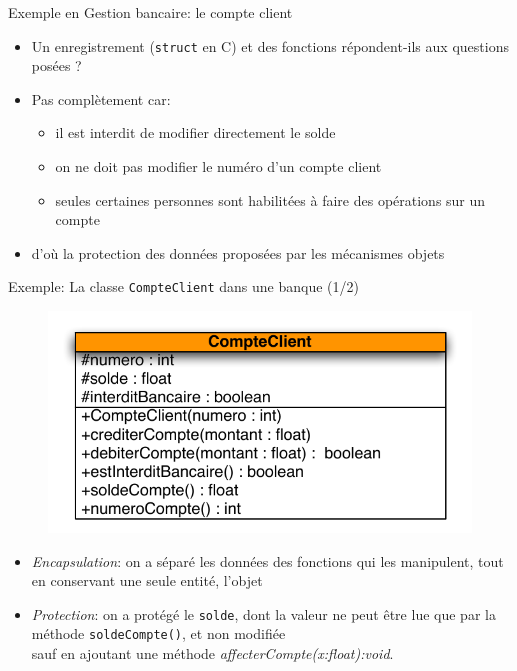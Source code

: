\begin{frame}{Exemple en Gestion bancaire: le compte client}
\begin{itemize}
	\item Un enregistrement (\texttt{struct} en C) et des fonctions répondent-ils aux questions posées ?
	\item Pas complètement car:

\begin{itemize}
	\item il est interdit de modifier directement le solde
	\item on ne doit pas modifier le numéro d'un compte client
	\item seules certaines personnes sont habilitées à faire des opérations sur un compte
\end{itemize}

\item d'où la protection des données proposées par les mécanismes objets
\end{itemize}
\end{frame}

\begin{frame}{Exemple: La classe {\tt CompteClient} dans une banque (1/2)}
\vspace*{-4mm}
  \begin{figure}[htbp]
    \begin{center}
      \includegraphics[scale=0.5]{fig/CompteClient.pdf}
    \end{center}
  \end{figure}
\vspace*{-6mm}
\begin{itemize}
	\item \emph{Encapsulation}: on a séparé les données des fonctions qui les manipulent, tout en conservant une seule entité, l'objet
	\item \emph{Protection}: on a protégé le {\tt solde}, dont la valeur ne peut être lue que par la méthode {\tt soldeCompte()}, et non modifiée\\ {\small sauf en ajoutant une méthode \textit{affecterCompte(x:float):void}.
}
\end{itemize}
\vspace*{-4mm}
\end{frame}

